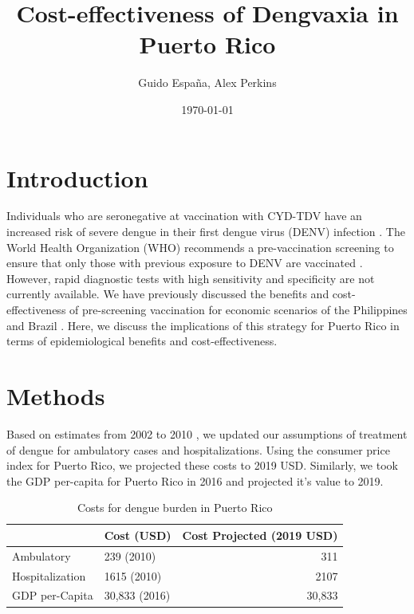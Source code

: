 \documentclass[12pt]{article}
\author{Guido España, Alex Perkins}
\date{\today}
\title{Cost-effectiveness of Dengvaxia in Puerto Rico}
\begin{document}
\linenumbers
\maketitle


\section{Introduction}
Individuals who are seronegative at vaccination with CYD-TDV have an increased risk of severe dengue in their first dengue virus (DENV) infection \cite{Sridhar2018}. The World Health Organization (WHO) recommends a pre-vaccination screening to ensure that only those with previous exposure to DENV are vaccinated \cite{WHO2018}. However, rapid diagnostic tests with high sensitivity and specificity are not currently available. We have previously discussed the benefits and cost-effectiveness of pre-screening vaccination for economic scenarios of the Philippines and Brazil \cite{Espana2019Biorxiv}. Here, we discuss the implications of this strategy for Puerto Rico in terms of epidemiological benefits and cost-effectiveness. 



\section{Methods}
Based on estimates from 2002 to 2010 \cite{Halasa2012}, we updated our assumptions of treatment of dengue for ambulatory cases and hospitalizations. Using the consumer price index for Puerto Rico, we projected these costs to 2019 USD. Similarly, we took the GDP per-capita for Puerto Rico in 2016 \cite{worldbank2016} and projected it's value to 2019. 

\begin{table}
  \begin{center}
    \begin{tabular}{|l|l|r|}
      \hline
      & Cost (USD) & Cost Projected (2019 USD)\\
      \hline
      Ambulatory & 239 (2010) & 311\\
      Hospitalization & 1615 (2010) & 2107\\
      GDP per-Capita & 30,833 (2016) & 30,833\\
      \hline
    \end{tabular}
  \end{center}
  \caption{\label{tbl-costs} Costs for dengue burden in Puerto Rico}
\end{table}
\end{document}
